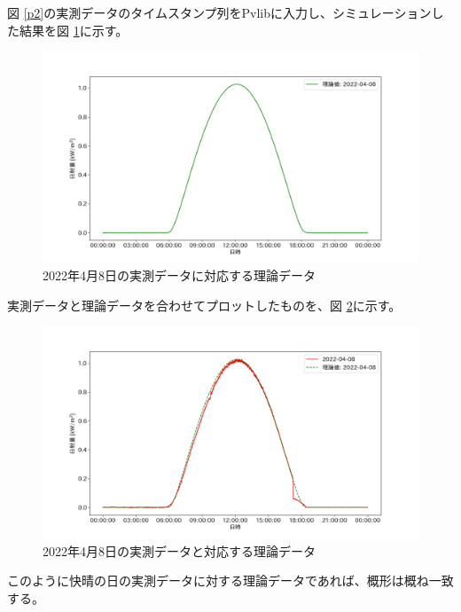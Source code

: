 \documentclass[a4j,12pt,]{jarticle}
\begin{document}
図 \ref{p2}の実測データのタイムスタンプ列をPvlibに入力し、シミュレーションした結果を図 \ref{p3}に示す。

\begin{figure}[H]
  \begin{center}
    \includegraphics[width=160mm]{theoretical.png}
    \caption{2022年4月8日の実測データに対応する理論データ}
    \label{p3}
  \end{center}
\end{figure}

実測データと理論データを合わせてプロットしたものを、図 \ref{p4}に示す。

\begin{figure}[H]
  \begin{center}
    \includegraphics[width=160mm]{real_and_theoretical.png}
    \caption{2022年4月8日の実測データと対応する理論データ}
    \label{p4}
  \end{center}
\end{figure}

このように快晴の日の実測データに対する理論データであれば、概形は概ね一致する。
\end{document}
